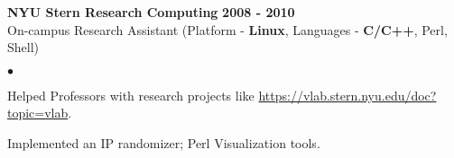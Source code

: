 \documentclass[margin,line]{res}
\newenvironment{list2}{
  \begin{list}{$\bullet$}{%
      \setlength{\itemsep}{0.05in}
      \setlength{\parsep}{0in} \setlength{\parskip}{0in}
      \setlength{\topsep}{-0.1in} \setlength{\partopsep}{0in}
      \setlength{\leftmargin}{0.2in}}}{\end{list}}
\begin{document}
\begin{resume}
\vspace {0.1in}
{\bf NYU Stern Research Computing} \hfill {\bf 2008 - 2010}\\
On-campus Research Assistant (Platform - {\bf Linux}, Languages - {\bf C/C++}, Perl, Shell)
\begin{list2}
\item Helped Professors with research projects like \href{https://vlab.stern.nyu.edu/doc?topic=vlab}{https://vlab.stern.nyu.edu/doc?topic=vlab}.
\item Implemented an IP randomizer; Perl Visualization tools.

\end{list2}
\end{resume}
\end{document}
